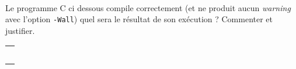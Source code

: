 \documentclass[11pt,a4paper]{article}
\begin{document}
\begin{Exercise}[title={Un programme en C}]\\
Le programme C ci dessous compile correctement (et ne produit aucun \textit{warning} avec l'option {\tt -Wall}) quel sera le résultat de son exécution ? Commenter et justifier.
\renewcommand{\arraystretch}{2}
	\begin{tabularx}{\linewidth}{|X|}
		\hline
		\dotfill \\ 
		\dotfill \\ 
		\dotfill \\ 
		\dotfill \\ 
		\dotfill \\ 
		\hline
	\end{tabularx}
	
\end{Exercise}
\end{document}
